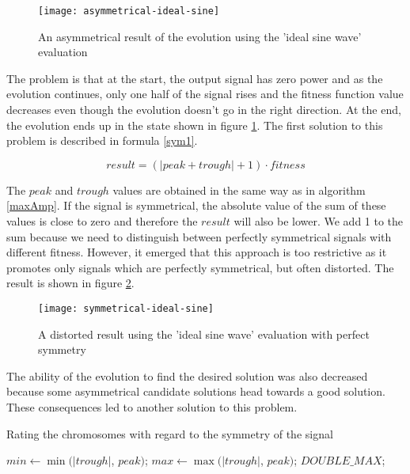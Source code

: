 \begin{figure}[!ht]
    \centerline{\texttt{[image: asymmetrical-ideal-sine]}\label{asymmetrical-ideal-sine}}
    \caption{An asymmetrical result of the evolution using the 'ideal sine wave' evaluation}
\end{figure}

The problem is that at the start, the output signal has zero power and as the evolution continues, only one half of the signal rises and the fitness function value decreases even though the evolution doesn't go in the right direction. At the end, the evolution ends up in the state shown in figure \ref{asymmetrical-ideal-sine}. The first solution to this problem is described in formula \ref{sym1}.

\begin{equation} \label{sym1}
result = (|peak + trough| + 1) \cdot fitness
\end{equation}

The $peak$ and $trough$ values are obtained in the same way as in algorithm \ref{maxAmp}. If the signal is symmetrical, the absolute value of the sum of these values is close to zero and therefore the $result$ will also be lower. We add 1 to the sum because we need to distinguish between perfectly symmetrical signals with different fitness. However, it emerged that this approach is too restrictive as it promotes only signals which are perfectly symmetrical, but often distorted. The result is shown in figure \ref{symmetrical-ideal-sine}.

\begin{figure}[!ht]
    \centerline{\texttt{[image: symmetrical-ideal-sine]}\label{symmetrical-ideal-sine}}
    \caption{A distorted result using the 'ideal sine wave' evaluation with perfect symmetry}
\end{figure}

The ability of the evolution to find the desired solution was also decreased because some asymmetrical candidate solutions head towards a good solution. These consequences led to another solution to this problem.

\begin{algorithm}
\caption{Rating the chromosomes with regard to the symmetry of the signal}
\label{symmetry-rating}
\begin{algorithmic}[1]
    \State $min \gets \min(|trough|$, $peak)$;
    \State $max \gets \max(|trough|$, $peak)$;
        \State \Return $DOUBLE\_MAX$;
    \EndIf
    \EndFunction
\end{algorithmic}
\end{algorithm}

